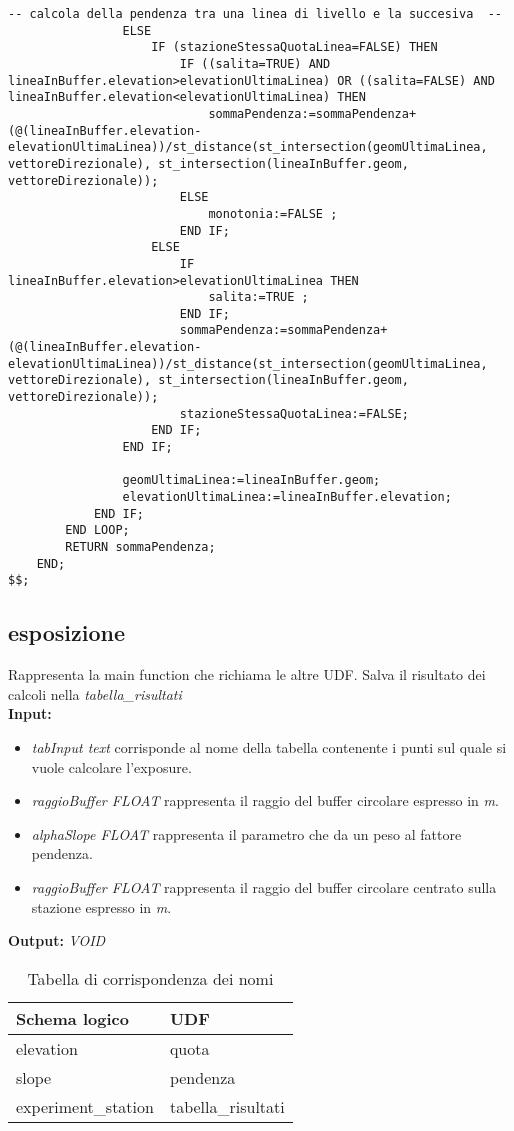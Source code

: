 \begin{lstlisting}[style=mySQL]
				-- calcola della pendenza tra una linea di livello e la succesiva  --
				ELSE
					IF (stazioneStessaQuotaLinea=FALSE) THEN
						IF ((salita=TRUE) AND lineaInBuffer.elevation>elevationUltimaLinea) OR ((salita=FALSE) AND lineaInBuffer.elevation<elevationUltimaLinea) THEN
							sommaPendenza:=sommaPendenza+(@(lineaInBuffer.elevation-elevationUltimaLinea))/st_distance(st_intersection(geomUltimaLinea, vettoreDirezionale), st_intersection(lineaInBuffer.geom, vettoreDirezionale));
						ELSE
							monotonia:=FALSE ;
						END IF;
					ELSE
						IF lineaInBuffer.elevation>elevationUltimaLinea THEN
							salita:=TRUE ;
						END IF;
						sommaPendenza:=sommaPendenza+(@(lineaInBuffer.elevation-elevationUltimaLinea))/st_distance(st_intersection(geomUltimaLinea, vettoreDirezionale), st_intersection(lineaInBuffer.geom, vettoreDirezionale));
						stazioneStessaQuotaLinea:=FALSE;
					END IF;
				END IF;

				geomUltimaLinea:=lineaInBuffer.geom;
				elevationUltimaLinea:=lineaInBuffer.elevation;
			END IF;
		END LOOP;
		RETURN sommaPendenza;
	END;
$$;
\end{lstlisting}

\subsection{esposizione}
Rappresenta la main function che richiama le altre UDF. Salva il risultato dei calcoli nella \textit{tabella\_risultati}\\
\textbf{Input:}
\begin{itemize}
\item \textit{tabInput text} corrisponde al nome della tabella contenente i punti sul quale si vuole calcolare l'exposure. 
\item \textit{raggioBuffer FLOAT} rappresenta il raggio del buffer circolare espresso in \textit{m}.
\item \textit{alphaSlope FLOAT} rappresenta il parametro che da un peso al fattore pendenza.
\item \textit{raggioBuffer FLOAT } rappresenta il raggio del buffer circolare centrato sulla stazione espresso in \textit{m}.
\end{itemize}
\textbf{Output:} \textit{VOID} 

\begin{table}[h]
\centering
\caption{Tabella di corrispondenza dei nomi}
\label{mapTb3}
\begin{tabular}{|l|l|}
\hline
Schema logico       & UDF                \\ \hline
elevation           & quota              \\
slope               & pendenza           \\
experiment\_station & tabella\_risultati \\ \hline
\end{tabular}
\end{table}

